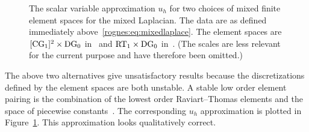 \begin{figure}
  \center
  \caption{The scalar variable approximation $u_h$ for two choices
    of mixed finite element spaces for the mixed Laplacian. The data
    are as defined immediately above~\eqref{rognes:eq:mixedlaplace}.
    The element spaces are $[\mathrm{CG}_{1}]^{2} \times \mathrm{DG}_{0}$
    in~ and $\mathrm{RT}_{1} \times \mathrm{DG}_{0}$
    in~. (The scales are less relevant for the
    current purpose and have therefore been
    omitted.)}
  \label{rognes:fig:example}
\end{figure}

The above two alternatives give unsatisfactory results because the
discretizations defined by the element spaces are both unstable. A
stable low order element pairing is the combination of the lowest
order Raviart--Thomas elements and the space of piecewise
constants~\citep{RaviartThomas1977}. The corresponding $u_h$
approximation is plotted in
Figure~\ref{rognes:fig:example}. This
approximation looks qualitatively correct.

